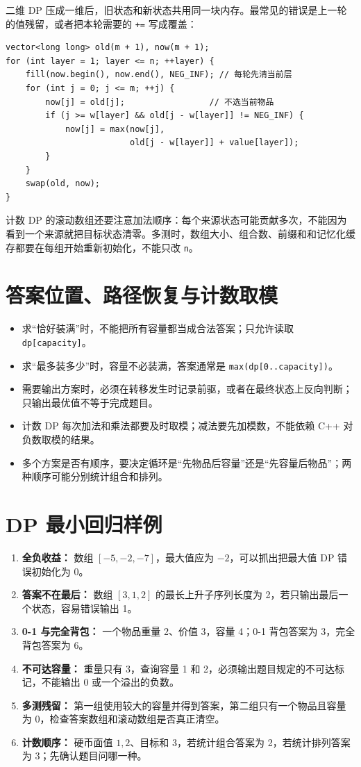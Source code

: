 \documentclass[UTF8,openany,oneside,zihao=-4]{ctexbook}
\begin{document}
二维 DP 压成一维后，旧状态和新状态共用同一块内存。最常见的错误是上一轮的值残留，或者把本轮需要的 \lstinline|+=| 写成覆盖：

\begin{lstlisting}
vector<long long> old(m + 1), now(m + 1);
for (int layer = 1; layer <= n; ++layer) {
    fill(now.begin(), now.end(), NEG_INF); // 每轮先清当前层
    for (int j = 0; j <= m; ++j) {
        now[j] = old[j];                 // 不选当前物品
        if (j >= w[layer] && old[j - w[layer]] != NEG_INF) {
            now[j] = max(now[j],
                         old[j - w[layer]] + value[layer]);
        }
    }
    swap(old, now);
}
\end{lstlisting}

计数 DP 的滚动数组还要注意加法顺序：每个来源状态可能贡献多次，不能因为看到一个来源就把目标状态清零。多测时，数组大小、组合数、前缀和和记忆化缓存都要在每组开始重新初始化，不能只改 \lstinline|n|。

\section{答案位置、路径恢复与计数取模}

\begin{itemize}
  \item 求“恰好装满”时，不能把所有容量都当成合法答案；只允许读取 \lstinline|dp[capacity]|。
  \item 求“最多装多少”时，容量不必装满，答案通常是 \lstinline|max(dp[0..capacity])|。
  \item 需要输出方案时，必须在转移发生时记录前驱，或者在最终状态上反向判断；只输出最优值不等于完成题目。
  \item 计数 DP 每次加法和乘法都要及时取模；减法要先加模数，不能依赖 C++ 对负数取模的结果。
  \item 多个方案是否有顺序，要决定循环是“先物品后容量”还是“先容量后物品”；两种顺序可能分别统计组合和排列。
\end{itemize}

\section{DP 最小回归样例}

\begin{enumerate}
  \item \textbf{全负收益：} 数组 $[-5,-2,-7]$，最大值应为 $-2$，可以抓出把最大值 DP 错误初始化为 0。
  \item \textbf{答案不在最后：} 数组 $[3,1,2]$ 的最长上升子序列长度为 2，若只输出最后一个状态，容易错误输出 1。
  \item \textbf{0-1 与完全背包：} 一个物品重量 2、价值 3，容量 4；0-1 背包答案为 3，完全背包答案为 6。
  \item \textbf{不可达容量：} 重量只有 3，查询容量 1 和 2，必须输出题目规定的不可达标记，不能输出 0 或一个溢出的负数。
  \item \textbf{多测残留：} 第一组使用较大的容量并得到答案，第二组只有一个物品且容量为 0，检查答案数组和滚动数组是否真正清空。
  \item \textbf{计数顺序：} 硬币面值 $1,2$、目标和 3，若统计组合答案为 2，若统计排列答案为 3；先确认题目问哪一种。
\end{enumerate}
\end{document}
